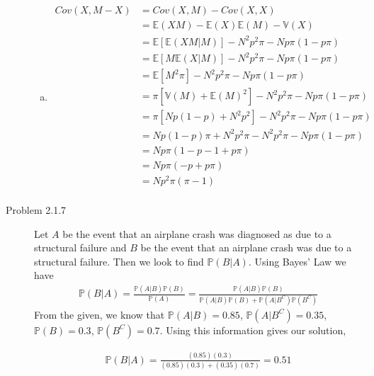 \documentclass[12pt]{article}  %
\newcommand{\E}{{\mathbb{E}}}
\newcommand{\V}{{\mathbb{V}}}
\newcommand{\prob}{{\mathbb{P}}}
\begin{document}
\begin{description}
\begin{enumerate}[(a)]
\item 
\begin{align*}
Cov(X,M-X) &= Cov(X,M) - Cov(X,X) \\
&= \E(XM) - \E(X)\E(M) - \V(X)\\
&= \E[\E(XM|M)] - N^2p^2\pi - Np\pi(1-p\pi)\\
&= \E[M\E(X|M)]- N^2p^2\pi - Np\pi(1-p\pi)\\
&= \E[M^2\pi]- N^2p^2\pi - Np\pi(1-p\pi)\\
&= \pi[\V(M) + \E(M)^2]- N^2p^2\pi - Np\pi(1-p\pi)\\
&= \pi[Np(1-p) + N^2p^2]- N^2p^2\pi - Np\pi(1-p\pi)\\
&= Np(1-p)\pi + N^2p^2\pi- N^2p^2\pi - Np\pi(1-p\pi)\\
&= Np\pi(1-p  - 1+p\pi)\\
&= Np\pi(-p +p\pi)\\
&= Np^2\pi(\pi-1)\\
\end{align*}
\end{enumerate}


\item[Problem 2.1.7] Let $A$ be the event that an airplane crash was diagnosed as due to a structural failure and $B$ be the event that an airplane crash was due to a structural failure. Then we look to find $\prob(B|A)$. Using Bayes' Law we have 
\begin{align*}
\prob(B|A) = \frac{\prob(A|B)\prob(B)}{\prob(A)} = \frac{\prob(A|B)\prob(B)}{\prob(A|B)\prob(B) + \prob(A|B^C)\prob(B^C)}
 \end{align*} 
From the given, we know that $\prob(A|B) = 0.85$, $\prob(A|B^C) = 0.35$, $\prob(B) = 0.3$, $\prob(B^C) = 0.7$. Using this information gives our solution, 

\begin{align*}
\prob(B|A) = \frac{(0.85)(0.3)}{(0.85)(0.3) + (0.35)(0.7)} = 0.51
 \end{align*}


\end{description}	
\end{document}
